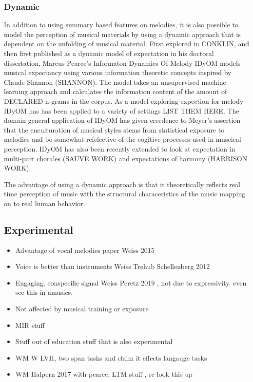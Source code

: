 \documentclass[]{book}
\begin{document}
\hypertarget{dynamic}{%
\subsubsection{Dynamic}\label{dynamic}}

In addition to using summary based features on melodies, it is also possible to model the perception of musical materials by using a dynamic approach that is dependent on the unfolding of musical material.
First explored in CONKLIN, and then first published as a dynamic model of expectation in his doctoral dissertation, Marcus Pearce's Informaton Dynamics Of Melody IDyOM models musical expectancy using various information theoretic concepts inspired by Claude Shannon (SHANNON).
The model takes an unsupervised machine learning approach and calculates the information content of the amount of DECLARED n-grams in the corpus.
As a model exploring expection for melody IDyOM has has been applied to a variety of settings LIST THEM HERE.
The domain general application of IDyOM has given creedence to Meyer's assertion that the enculturation of musical styles stems from statistical exposure to melodies and be somewhat refelective of the cogitive processes used in muscical perception.
IDyOM has also been recently extended to look at expectation in multi-part chorales (SAUVE WORK) and expectations of harmony (HARRISON WORK).

\citep{pearceAuditoryExpectationInformation2012a, pearceStatisticalLearningProbabilistic2018}

The advantage of using a dynamic approach is that it theoretically reflects real time perception of music with the structural characeristics of the music mapping on to real human behavior.

\hypertarget{experimental}{%
\subsection{Experimental}\label{experimental}}

\begin{itemize}
\item
  Advantage of vocal melodies paper \textbar{} Weiss 2015
\item
  Voice is better than instruments Weiss Trehub Schellenberg 2012
\item
  Engaging, conspecific signal Weiss Peretz 2019 , not due to expressivity. even see this in amusics.
\item
  Not affected by musical training or exposure
\item
  MIR stuff
\item
  Stuff out of education stuff that is also experimental
\item
  WM W LVH, two span tasks and claim it effects langauge tasks
\item
  WM Halpern 2017 with pearce, LTM stuff , re look this up
\end{itemize}
\end{document}
